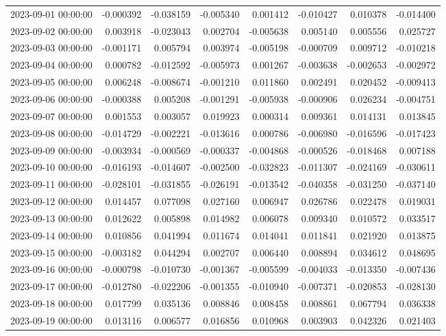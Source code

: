 \begin{tabular}{lrrrrrrr}
2023-09-01 00:00:00 & -0.000392 & -0.038159 & -0.005340 & 0.001412 & -0.010427 & 0.010378 & -0.014400 \\
2023-09-02 00:00:00 & 0.003918 & -0.023043 & 0.002704 & -0.005638 & 0.005140 & 0.005556 & 0.025727 \\
2023-09-03 00:00:00 & -0.001171 & 0.005794 & 0.003974 & -0.005198 & -0.000709 & 0.009712 & -0.010218 \\
2023-09-04 00:00:00 & 0.000782 & -0.012592 & -0.005973 & 0.001267 & -0.003638 & -0.002653 & -0.002972 \\
2023-09-05 00:00:00 & 0.006248 & -0.008674 & -0.001210 & 0.011860 & 0.002491 & 0.020452 & -0.009413 \\
2023-09-06 00:00:00 & -0.000388 & 0.005208 & -0.001291 & -0.005938 & -0.000906 & 0.026234 & -0.004751 \\
2023-09-07 00:00:00 & 0.001553 & 0.003057 & 0.019923 & 0.000314 & 0.009361 & 0.014131 & 0.013845 \\
2023-09-08 00:00:00 & -0.014729 & -0.002221 & -0.013616 & 0.000786 & -0.006980 & -0.016596 & -0.017423 \\
2023-09-09 00:00:00 & -0.003934 & -0.000569 & -0.000337 & -0.004868 & -0.000526 & -0.018468 & 0.007188 \\
2023-09-10 00:00:00 & -0.016193 & -0.014607 & -0.002500 & -0.032823 & -0.011307 & -0.024169 & -0.030611 \\
2023-09-11 00:00:00 & -0.028101 & -0.031855 & -0.026191 & -0.013542 & -0.040358 & -0.031250 & -0.037140 \\
2023-09-12 00:00:00 & 0.014457 & 0.077098 & 0.027160 & 0.006947 & 0.026786 & 0.022478 & 0.019031 \\
2023-09-13 00:00:00 & 0.012622 & 0.005898 & 0.014982 & 0.006078 & 0.009340 & 0.010572 & 0.033517 \\
2023-09-14 00:00:00 & 0.010856 & 0.041994 & 0.011674 & 0.014041 & 0.011841 & 0.021920 & 0.013875 \\
2023-09-15 00:00:00 & -0.003182 & 0.044294 & 0.002707 & 0.006440 & 0.008894 & 0.034612 & 0.048695 \\
2023-09-16 00:00:00 & -0.000798 & -0.010730 & -0.001367 & -0.005599 & -0.004033 & -0.013350 & -0.007436 \\
2023-09-17 00:00:00 & -0.012780 & -0.022206 & -0.001355 & -0.010940 & -0.007371 & -0.020853 & -0.028130 \\
2023-09-18 00:00:00 & 0.017799 & 0.035136 & 0.008846 & 0.008458 & 0.008861 & 0.067794 & 0.036338 \\
2023-09-19 00:00:00 & 0.013116 & 0.006577 & 0.016856 & 0.010968 & 0.003903 & 0.042326 & 0.021403 \\

\end{tabular}
